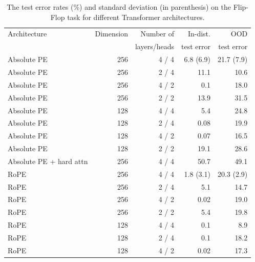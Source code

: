 \documentclass{article}
\newcommand{\std}[1]{\small (#1)}
\begin{document}
\begin{table}[t]
  \caption{The test error rates (\%) and standard deviation (in parenthesis) on the Flip-Flop task for different Transformer architectures. 
  }
  \label{tab:flipflopy}
  \centering
  \begin{tabular}{lrrrr}
    \toprule
        Architecture   &  Dimension & Number of & In-dist. & OOD \\
          &   & layers/heads & test error & test error  \\
    \midrule
    \midrule
    Absolute PE  & 256 & 4 / 4 & 6.8 \std{6.9} & 21.7 \std{7.9} \\
    Absolute PE  & 256 & 2 / 4 & 11.1 & 10.6 \\
    Absolute PE  & 256 & 4 / 2 & 0.1 & 18.0 \\
    Absolute PE  & 256 & 2 / 2 & 13.9 & 31.5 \\
    Absolute PE  & 128 & 4 / 4 & 5.4 & 24.8 \\
    Absolute PE  & 128 & 2 / 4 & 0.08 & 19.9 \\
    Absolute PE  & 128 & 4 / 2 & 0.07 & 16.5 \\
    Absolute PE  & 128 & 2 / 2 & 19.1 & 28.6 \\
    \midrule
    Absolute PE + hard attn & 256 & 4 / 4 & 50.7 & 49.1 \\
    \midrule
    RoPE & 256 & 4 / 4 & 1.8 \std{3.1} & 20.3 \std{2.9} \\
    RoPE & 256 & 2 / 4 & 5.1 & 14.7 \\
    RoPE & 256 & 4 / 2 & 0.02 & 19.0 \\
    RoPE & 256 & 2 / 2 & 5.4 & 19.8 \\
    RoPE & 128 & 4 / 4 & 0.1 & 8.9 \\
    RoPE & 128 & 2 / 4 & 0.1 & 18.2 \\
    RoPE & 128 & 4 / 2 & 0.02 & 17.3 \\

\end{tabular}
\end{table}
\end{document}
